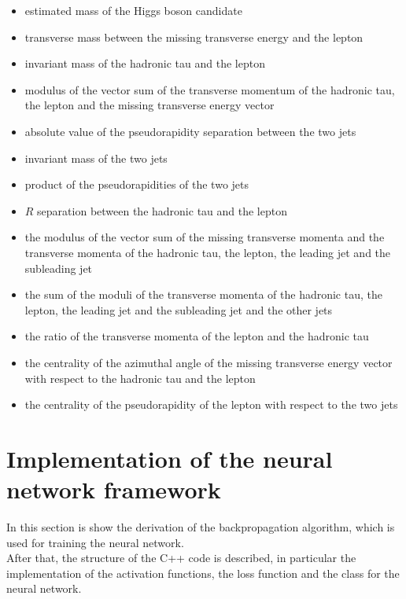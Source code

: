\documentclass[12pt]{article}
\begin{document}
\begin{itemize}
  \item estimated mass of the Higgs boson candidate
  \item transverse mass between the missing transverse energy and the lepton
  \item invariant mass of the hadronic tau and the lepton
  \item modulus of the vector sum of the transverse momentum of the hadronic tau, the lepton and the missing 
	transverse energy vector
  \item absolute value of the pseudorapidity separation between the two jets
  \item invariant mass of the two jets
  \item product of the pseudorapidities of the two jets
  \item $R$ separation between the hadronic tau and the lepton
  \item the modulus of the vector sum of the missing transverse momenta and the transverse momenta of the 
	hadronic tau, the lepton, the leading jet and the subleading jet
  \item the sum of the moduli of the transverse momenta of the hadronic tau, the lepton, the leading jet
	and the subleading jet and the other jets
  \item the ratio of the transverse momenta of the lepton and the hadronic tau
  \item the centrality of the azimuthal angle of the missing transverse energy vector with respect to the 
	hadronic tau and the lepton
  \item the centrality of the pseudorapidity of the lepton with respect to the two jets
\end{itemize}
\pagebreak

\section{Implementation of the neural network framework}
In this section is show the derivation of the backpropagation algorithm, which is used for training the 
neural network. \\
After that, the structure of the C++ code is described, in particular the implementation of the activation
functions, the loss function and the class for the neural network.
\end{document}

